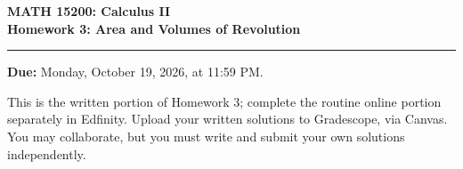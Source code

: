 \documentclass[12pt,letterpaper]{article}
\begin{document}
\begin{center}
  {\large\bfseries MATH 15200: Calculus II}\\
  {\large\bfseries Homework 3: Area and Volumes of Revolution}
\end{center}

\vspace{0.25em}
\hrule
\vspace{0.8em}

\textbf{Due:} Monday, October 19, 2026, at 11:59 PM.

This is the written portion of Homework 3; complete the routine online portion
separately in Edfinity. Upload your written solutions to Gradescope, via Canvas. You may
collaborate, but you must write and submit your own solutions independently.



\vspace{0.8em}
\end{document}
